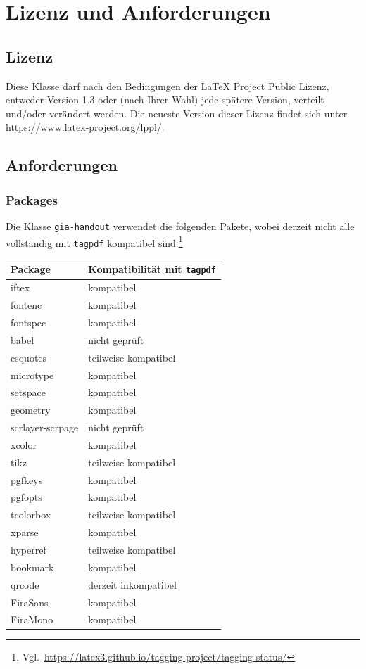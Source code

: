 \documentclass[a4paper]{article}
\newcommand\pkg[1]{\texttt{#1}}
\begin{document}
\section{Lizenz und Anforderungen}
\subsection{Lizenz}
Diese Klasse darf nach den Bedingungen der LaTeX Project Public Lizenz, entweder Version 1.3 oder (nach Ihrer Wahl) jede spätere Version, verteilt und/oder verändert werden.
Die neueste Version dieser Lizenz findet sich unter \url{https://www.latex-project.org/lppl/}.
\subsection{Anforderungen}
\subsubsection{Packages}
Die Klasse \pkg{gia-handout} verwendet die folgenden Pakete, wobei derzeit nicht alle vollständig mit \pkg{tagpdf} kompatibel sind.\footnote{Vgl.~\url{https://latex3.github.io/tagging-project/tagging-status/}}
\begin{table}[!h]
    \centering
    \begin{tabular}{ll}
        \hline
        \textbf{Package} & \textbf{Kompatibilität mit \pkg{tagpdf}}\\
        \hline
        iftex & kompatibel\\
        fontenc & kompatibel\\
        fontspec & kompatibel\\
        babel & nicht geprüft\\
        csquotes & teilweise kompatibel\\
        microtype & kompatibel\\
        setspace & kompatibel\\
        geometry & kompatibel\\
        scrlayer-scrpage & nicht geprüft\\
        xcolor & kompatibel\\
        tikz & teilweise kompatibel\\
        pgfkeys & kompatibel\\
        pgfopts & kompatibel\\
        tcolorbox & teilweise kompatibel\\
        xparse & kompatibel\\
        hyperref & teilweise kompatibel\\
        bookmark & kompatibel\\
        qrcode & derzeit inkompatibel\\
        FiraSans & kompatibel\\
        FiraMono & kompatibel\\
        \hline
    \end{tabular}
\end{table}
\end{document}
